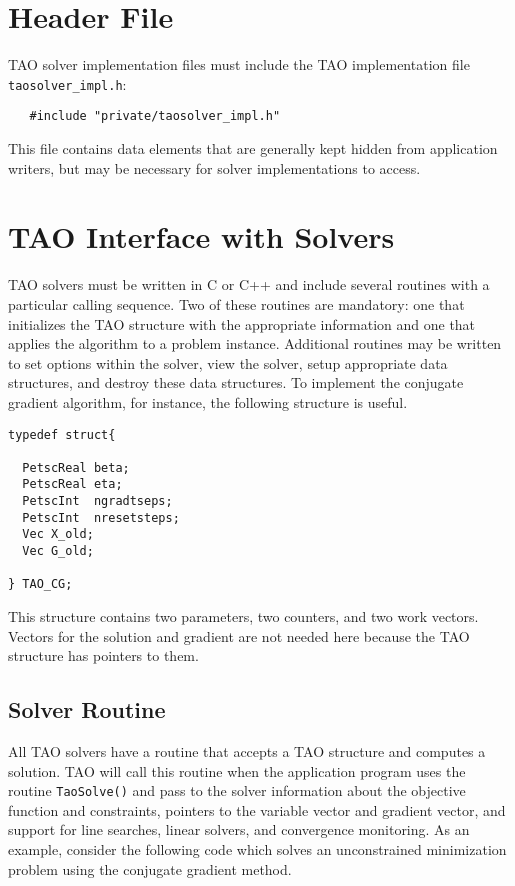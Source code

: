 \section{Header File}
TAO solver implementation files must include the TAO implementation file \texttt{taosolver\_impl.h}:
\begin{verbatim}
   #include "private/taosolver_impl.h"
\end{verbatim}
This file contains data elements that are generally kept hidden from application
writers, but may be necessary for solver implementations to access.
\noindent


\section{TAO Interface with Solvers}
TAO solvers must be written in C or C++ and include several routines with
a particular calling sequence.  Two of these routines are mandatory:
one that initializes the TAO structure with the appropriate information
and one that applies the algorithm to a problem instance.
Additional routines may be written to set options within the
solver, view the solver, setup appropriate data structures, and destroy
these data structures. To implement the conjugate
gradient algorithm, for instance, the following structure is
useful.
\begin{verbatim}
typedef struct{

  PetscReal beta;
  PetscReal eta;
  PetscInt  ngradtseps;
  PetscInt  nresetsteps;
  Vec X_old;
  Vec G_old; 

} TAO_CG;
\end{verbatim}
This structure contains two parameters, two counters, and two work vectors.
Vectors
for the solution and gradient are not needed here because the TAO
structure has pointers to them.


\subsection{Solver Routine}
All TAO solvers have a routine that accepts a TAO structure and
computes a solution.  
TAO will call this routine when the application
program uses the routine {\tt TaoSolve()} and pass to the solver
information
about the objective function and constraints, pointers to the
variable vector and gradient vector, and support for line searches,
linear solvers, and convergence monitoring.  As an example, consider
the following code which solves an unconstrained minimization problem
using the conjugate gradient method.

